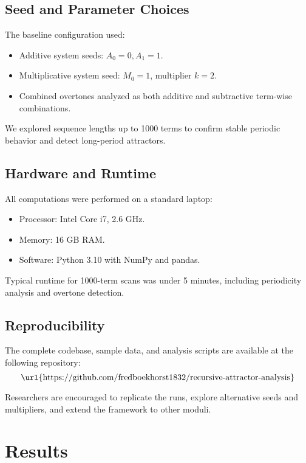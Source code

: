 \documentclass[12pt]{article}
\begin{document}
\subsection{Seed and Parameter Choices}

The baseline configuration used:
\begin{itemize}
    \item Additive system seeds: \( A_0 = 0, A_1 = 1 \).
    \item Multiplicative system seed: \( M_0 = 1 \), multiplier \( k = 2 \).
    \item Combined overtones analyzed as both additive and subtractive term-wise combinations.
\end{itemize}

We explored sequence lengths up to 1000 terms to confirm stable periodic behavior and detect long-period attractors.

\subsection{Hardware and Runtime}

All computations were performed on a standard laptop:
\begin{itemize}
    \item Processor: Intel Core i7, 2.6 GHz.
    \item Memory: 16 GB RAM.
    \item Software: Python 3.10 with NumPy and pandas.
\end{itemize}

Typical runtime for 1000-term scans was under 5 minutes, including periodicity analysis and overtone detection.

\subsection{Reproducibility}

The complete codebase, sample data, and analysis scripts are available at the following repository:
\[
\text{\url{https://github.com/fredboekhorst1832/recursive-attractor-analysis}}
\]

Researchers are encouraged to replicate the runs, explore alternative seeds and multipliers, and extend the framework to other moduli.

\newpage
\section{Results}
\end{document}
